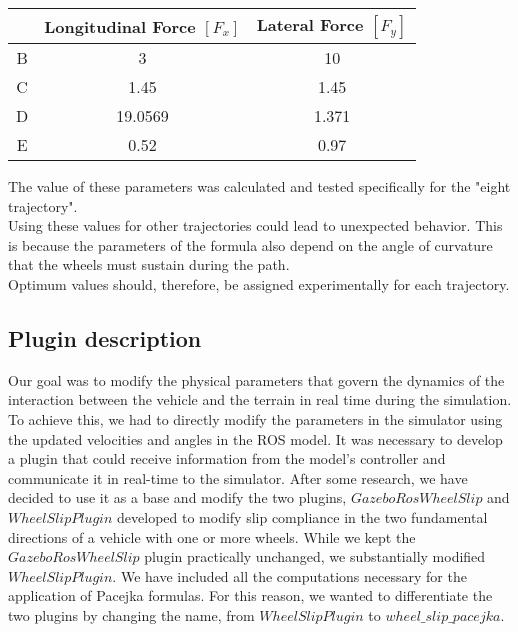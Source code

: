 \begin{center}
	\begin{tabular}{||c c c||} 
		\hline
		 & Longitudinal Force $[F_x]$ & Lateral Force $[F_y]$ \\ [0.5ex] 
		\hline\hline
		B & 3 & 10 \\ 
		\hline
		C & 1.45 & 1.45 \\
		\hline
		D & 19.0569 & 1.371 \\
		\hline
		E & 0.52 & 0.97 \\
		\hline
	\end{tabular}
\end{center}
The value of these parameters was calculated and tested specifically for the "eight trajectory".\\
Using these values for other trajectories could lead to unexpected behavior. This is because the parameters of the formula also depend on the angle of curvature that the wheels must sustain during the path. \\
Optimum values should, therefore, be assigned experimentally for each trajectory.

\subsection{Plugin description}

Our goal was to modify the physical parameters that govern the dynamics of the interaction between the vehicle and the terrain in real time during the simulation.
To achieve this, we had to directly modify the parameters in the simulator using the updated velocities and angles in the ROS model. It was necessary to develop a plugin that could receive information from the model's controller and communicate it in real-time to the simulator.
After some research, we have decided to use it as a base and modify the two plugins, $GazeboRosWheelSlip$ and $WheelSlipPlugin$ developed to modify slip compliance in the two fundamental directions of a vehicle with one or more wheels.
While we kept the $GazeboRosWheelSlip$ plugin practically unchanged, we substantially modified $WheelSlipPlugin$. We have included all the computations necessary for the application of Pacejka formulas. For this reason, we wanted to differentiate the two plugins by changing the name, from $WheelSlipPlugin$ to $wheel\_slip\_pacejka$.

